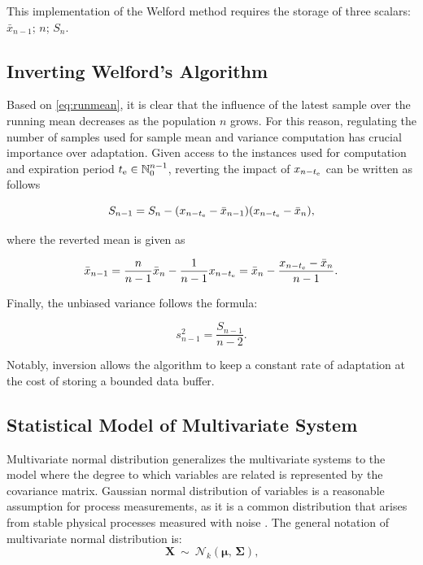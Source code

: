 This implementation of the Welford method requires the storage of three scalars: \(\bar x_{n-1}\); \(n\); \(S_n\).

\subsection{Inverting Welford's Algorithm}\label{AA:InvWelford}
Based on \eqref{eq:runmean}, it is clear that the influence of the latest sample over the running mean decreases as the population \(n\) grows. For this reason, regulating the number of samples used for sample mean and variance computation has crucial importance over adaptation. Given access to the instances used for computation and expiration period \(t _{\text{e}} \in \mathbb{N}_{0}^{n-1}\), reverting the impact of \(x_{n-t _{\text{e}}}\) can be written as follows

\begin{equation}
  S_{n-1} = S_n - (x_{n-t _{\text{e}}} - \bar x_{n-1})(x_{n-t _{\text{e}}} - \bar x_n)\text{,}\label{eq:revrunmean}
\end{equation}

where the reverted mean is given as

\begin{equation}
  \bar x_{n-1} = \frac{n}{n-1} \bar x_{n} - \frac{1}{n-1}x_{n-t _{\text{e}}} = \bar x_{n} - \frac{x_{n-t _{\text{e}}} - \bar x_{n}}{n-1}\text{.}\label{eq:revmean}
\end{equation}


Finally, the unbiased variance follows the formula:

\begin{equation}
  s^2_{n-1} = \frac{S_{n-1}}{n-2}\text{.}\label{eq:revvar}
\end{equation}

Notably, inversion allows the algorithm to keep a constant rate of adaptation at the cost of storing a bounded data buffer.

\subsection{Statistical Model of Multivariate System}\label{AA:Distribution}
Multivariate normal distribution generalizes the multivariate systems to the model where the degree to which variables are related is represented by the covariance matrix. Gaussian normal distribution of variables is a reasonable assumption for process measurements, as it is a common distribution that arises from stable physical processes measured with noise \citep{Mishra201831}. The general notation of multivariate normal distribution is:
\begin{equation}
  \mathbf{X}\ \sim\ \mathcal{N}_k(\boldsymbol\mu,\, \boldsymbol\Sigma)\text{,}\label{eq:distribution}
\end{equation}

